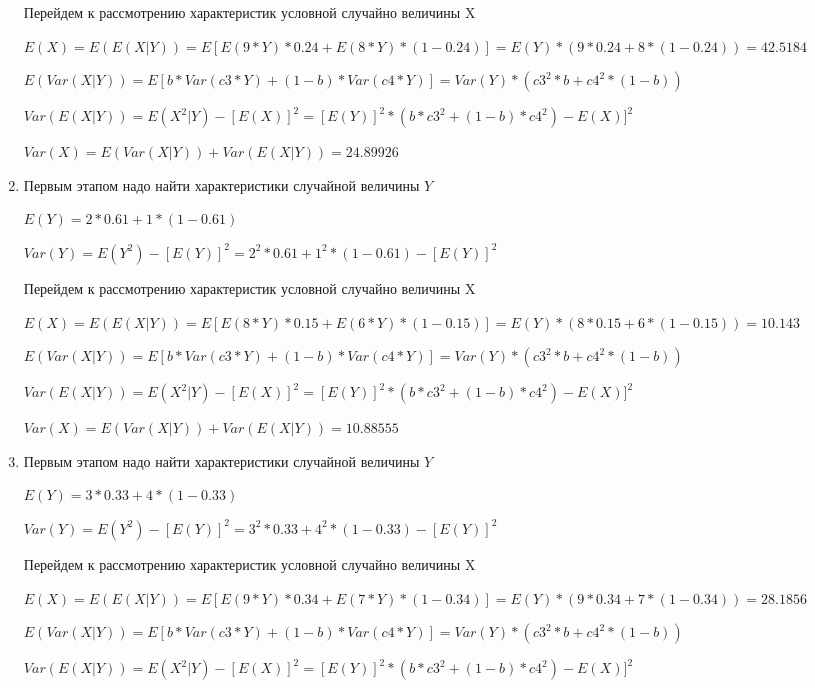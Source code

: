 \documentclass[a4paper,12pt]{article}
\begin{document}
\begin{enumerate}
	Перейдем к рассмотрению характеристик условной случайно величины X

	$E(X) = E(E(X|Y)) = E[E(9 * Y) * 0.24 + E(8 * Y) * (1 - 0.24)] = E(Y) * (9 * 0.24 + 8 * (1 - 0.24)) = 42.5184$

	$E(Var(X|Y)) = E[b * Var(c3 * Y) + (1 - b) * Var(c4 * Y)] = Var(Y) * (c3^2 * b + c4^2 * (1- b)) $

	$Var(E(X|Y)) = E(X^2|Y) - [E(X)]^2 = [E(Y)]^2 * (b * c3^2 + (1-b)*c4^2) - E(X)]^2$

	$Var(X) = E(Var(X|Y)) + Var(E(X|Y)) = 24.89926$
	


\item

	

	Первым этапом надо найти характеристики случайной величины $Y$

	$E(Y) = 2 * 0.61 + 1 * (1 - 0.61)$

	$Var(Y) = E(Y^2) - [E(Y)]^2 = 2^2 * 0.61 + 1^2 * (1 - 0.61) - [E(Y)]^2$


	Перейдем к рассмотрению характеристик условной случайно величины X

	$E(X) = E(E(X|Y)) = E[E(8 * Y) * 0.15 + E(6 * Y) * (1 - 0.15)] = E(Y) * (8 * 0.15 + 6 * (1 - 0.15)) = 10.143$

	$E(Var(X|Y)) = E[b * Var(c3 * Y) + (1 - b) * Var(c4 * Y)] = Var(Y) * (c3^2 * b + c4^2 * (1- b)) $

	$Var(E(X|Y)) = E(X^2|Y) - [E(X)]^2 = [E(Y)]^2 * (b * c3^2 + (1-b)*c4^2) - E(X)]^2$

	$Var(X) = E(Var(X|Y)) + Var(E(X|Y)) = 10.88555$
	


\item

	

	Первым этапом надо найти характеристики случайной величины $Y$

	$E(Y) = 3 * 0.33 + 4 * (1 - 0.33)$

	$Var(Y) = E(Y^2) - [E(Y)]^2 = 3^2 * 0.33 + 4^2 * (1 - 0.33) - [E(Y)]^2$


	Перейдем к рассмотрению характеристик условной случайно величины X

	$E(X) = E(E(X|Y)) = E[E(9 * Y) * 0.34 + E(7 * Y) * (1 - 0.34)] = E(Y) * (9 * 0.34 + 7 * (1 - 0.34)) = 28.1856$

	$E(Var(X|Y)) = E[b * Var(c3 * Y) + (1 - b) * Var(c4 * Y)] = Var(Y) * (c3^2 * b + c4^2 * (1- b)) $

	$Var(E(X|Y)) = E(X^2|Y) - [E(X)]^2 = [E(Y)]^2 * (b * c3^2 + (1-b)*c4^2) - E(X)]^2$


\end{enumerate}
\end{document}
